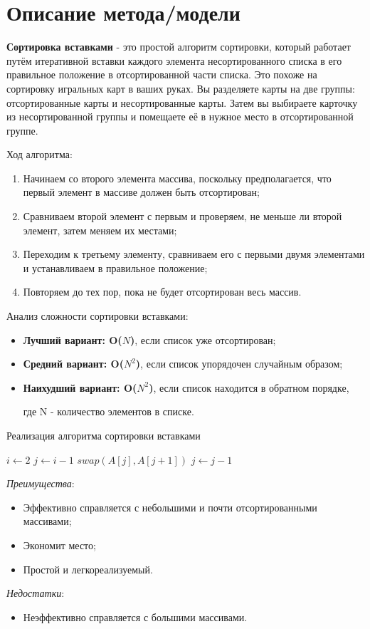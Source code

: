 \documentclass[12pt, a4paper]{report}
\begin{document}
	\section*{Описание метода/модели}
	\large
	\textbf{Сортировка вставками} - это простой алгоритм сортировки, который работает путём итеративной вставки каждого элемента несортированного списка в его правильное положение в отсортированной части списка. Это похоже на сортировку игральных карт в ваших руках. Вы разделяете карты на две группы: отсортированные карты и несортированные карты. Затем вы выбираете карточку из несортированной группы и помещаете её в нужное место в отсортированной группе. \par
	Ход алгоритма:
	\begin{enumerate}
		\item Начинаем со второго элемента массива, поскольку предполагается, что первый элемент в массиве должен быть отсортирован;
		\item Сравниваем второй элемент с первым и проверяем, не меньше ли второй элемент, затем меняем их местами;
		\item Переходим к третьему элементу, сравниваем его с первыми двумя элементами и устанавливаем в правильное положение;
		\item Повторяем до тех пор, пока не будет отсортирован весь массив.
	\end{enumerate}
	Анализ сложности сортировки вставками:
	\begin{itemize}
		\item \textbf{Лучший вариант: O(\( N \))}, если список уже отсортирован;
		\item \textbf{Средний вариант: O(\( N^2 \))}, если список упорядочен случайным образом;
		\item \textbf{Наихудший вариант: O(\( N^2 \))}, если список находится в обратном порядке, \par
		где N - количество элементов в списке.
	\end{itemize}
	\begin{algorithm}
		\caption{Реализация алгоритма сортировки вставками}
		\begin{algorithmic}
			\State $i \gets 2$
				\State $j \gets i - 1$
					\State $swap(A[j], A[j + 1])$
					\State $j \gets j - 1$
				\EndWhile
			\EndWhile
		\end{algorithmic}
	\end{algorithm}
	\textit{Преимущества}:
	\begin{itemize}
		\item Эффективно справляется с небольшими и почти отсортированными массивами;
		\item Экономит место;	
		\item Простой и легкореализуемый.
	\end{itemize}
	\textit{Недостатки}:
	\begin{itemize}
		\item Неэффективно справляется с большими массивами.
	\end{itemize}
\end{document}
